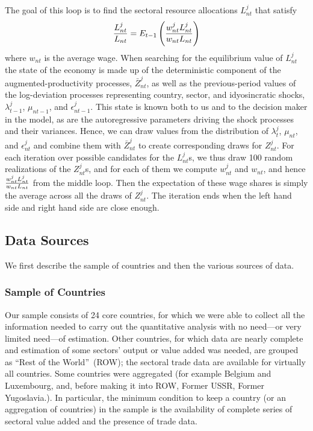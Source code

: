 \documentclass[12pt]{article}
\begin{document}
The goal of this loop is to find the sectoral resource allocations $%
L_{nt}^{j}$ that satisfy %
\begin{equation*}
\frac{L_{nt}^{j}}{L_{nt}}=E_{t-1}\left( \frac{w_{nt}^{j}L_{nt}^{j}}{%
w_{nt}L_{nt}}\right)
\end{equation*}%
where $w_{nt}$ is the average wage. When searching for the
equilibrium value of $L_{nt}^{j}$ the state of the economy is made
up of the deterministic component of the augmented-productivity processes, $%
\bar{Z}_{nt}^{j}$, as well as the previous-period values of the
log-deviation processes representing country, sector, and idyosincratic
shocks, $\lambda _{t-1}^{j}$, $\mu _{nt-1}$, and $%
\epsilon _{nt-1}^{j}$. This state is known both to us and to the
decision maker in the model, as are the autoregressive parameters driving the
shock processes and their variances. Hence, we can draw values from the
distribution of $\lambda _{t}^{j}$, $\mu _{nt}$, and $%
\epsilon _{nt}^{j}$ and combine them with $\bar{Z}_{nt}^{j}$
to create corresponding draws for $Z_{nt}^{j}$. For each iteration
over possible candidates for the $L_{nt}^{j}$s, we thus draw 100
random realizations of the $Z_{nt}^{j}$s, and for each of them we
compute $w_{nt}^{j}$ and $w_{nt}$, and hence $\frac{%
w_{nt}^{j}L_{nt}^{j}}{w_{nt}L_{nt}}$ from the middle loop. Then the
expectation of these wage shares is simply the average across all the draws
of $Z_{nt}^{j}$. The iteration ends when the left hand side and
right hand side are close enough.

\subsection*{Data Sources}

We first describe the sample of countries and then the various sources of
data.

\subsubsection*{Sample of Countries}

Our sample consists of 24 core countries, for which we were able to collect
all the information needed to carry out the quantitative analysis with no
need---or very limited need---of estimation. Other countries, for which data
are nearly complete and estimation of some sectors' output or value added
was needed, are grouped as \textquotedblleft Rest of the
World\textquotedblright\ (ROW); the sectoral trade data are available for
virtually all countries. Some countries were aggregated (for example Belgium
and Luxembourg, and, before making it into ROW, Former USSR, Former
Yugoslavia.). In particular, the minimum condition to keep a country (or an
aggregation of countries) in the sample is the availability of complete
series of sectoral value added and the presence of trade data.
\end{document}
